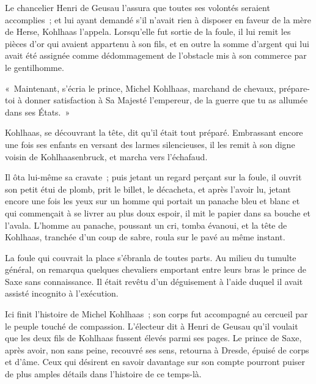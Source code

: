 \documentclass[french,twoside]{book} %
\newif\ifdev
\renewcommand{\LettrineFontHook}{\color{rubric}}
\newcommand{\initialiv}[2]{%
  \let\oldLFH\LettrineFontHook
  \IfSubStr{QJ’}{#1}{
    \lettrine[lines=4, lhang=0.2, loversize=-0.1, lraise=0.2]{\smash{#1}}{#2}
  }{\IfSubStr{É}{#1}{
    \lettrine[lines=4, lhang=0.2, loversize=-0, lraise=0]{\smash{#1}}{#2}
  }{\IfSubStr{ÀÂ}{#1}{
    \lettrine[lines=4, lhang=0.2, loversize=-0, lraise=0, slope=0.6em]{\smash{#1}}{#2}
  }{\IfSubStr{A}{#1}{
    \lettrine[lines=4, lhang=0.2, loversize=0.2, slope=0.6em]{\smash{#1}}{#2}
  }{\IfSubStr{V}{#1}{
    \lettrine[lines=4, lhang=0.2, loversize=0.2, slope=-0.5em]{\smash{#1}}{#2}
  }{
    \lettrine[lines=4, lhang=0.2, loversize=0.2]{\smash{#1}}{#2}
  }}}}}
  \let\LettrineFontHook\oldLFH
}
\newcommand\chapterclose{} %
\renewcommand{\LettrineFontHook}{\bfseries\color{rubric}}
\begin{document}
Le chancelier Henri de Geusau l’assura que toutes ses volontés seraient accomplies ; et lui ayant demandé s’il n’avait rien à disposer en faveur de la mère de Herse, Kohlhaas l’appela. Lorsqu’elle fut sortie de la foule, il lui remit les pièces d’or qui avaient appartenu à son fils, et en outre la somme d’argent qui lui avait été assignée comme dédommagement de l’obstacle mis à son commerce par le gentilhomme.\par
« Maintenant, s’écria le prince, Michel Kohlhaas, marchand de chevaux, prépare-toi à donner satisfaction à Sa Majesté l’empereur, de la guerre que tu as allumée dans ses États. »\par
Kohlhaas, se découvrant la tête, dit qu’il était tout préparé. Embrassant encore une fois ses enfants en versant des larmes silencieuses, il les remit à son digne voisin de Kohlhaasenbruck, et marcha vers l’échafaud.\par
Il ôta lui-même sa cravate ; puis jetant un regard perçant sur la foule, il ouvrit son petit étui de plomb, prit le billet, le décacheta, et après l’avoir lu, jetant encore une fois les yeux sur un homme qui portait un panache bleu et blanc et qui commençait à se livrer au plus doux espoir, il mit le papier dans sa bouche et l’avala. L’homme au panache, poussant un cri, tomba évanoui, et la tête de Kohlhaas, tranchée d’un coup de sabre, roula sur le pavé au même instant.\par
La foule qui couvrait la place s’ébranla de toutes parts. Au milieu du tumulte général, on remarqua quelques chevaliers emportant entre leurs bras le prince de Saxe sans connaissance. Il était revêtu d’un déguisement à l’aide duquel il avait assisté incognito à l’exécution.\par
Ici finit l’histoire de Michel Kohlhaas ; son corps fut accompagné au cercueil par le peuple touché de compassion. L’électeur dit à Henri de Geusau qu’il voulait que les deux fils de Kohlhaas fussent élevés parmi ses pages. Le prince de Saxe, après avoir, non sans peine, recouvré ses sens, retourna à Dresde, épuisé de corps et d’âme. Ceux qui désirent en savoir davantage sur son compte pourront puiser de plus amples détails dans l’histoire de ce temps-là.
\chapterclose

 


\ifbooklet
  \newpage\null\thispagestyle{empty}\newpage
\fi

\ifdev %
\fontname\font — \textsc{Les règles du jeu}\par
(\hyperref[utopie]{\underline{Lien}})\par
\noindent \initialiv{A}{lors là}\blindtext\par
\noindent \initialiv{À}{ la bonheur des dames}\blindtext\par
\noindent \initialiv{É}{tonnez-le}\blindtext\par
\noindent \initialiv{Q}{ualitativement}\blindtext\par
\noindent \initialiv{V}{aloriser}\blindtext\par
\Blindtext
\phantomsection
\label{utopie}
\Blinddocument
\fi
\end{document}
